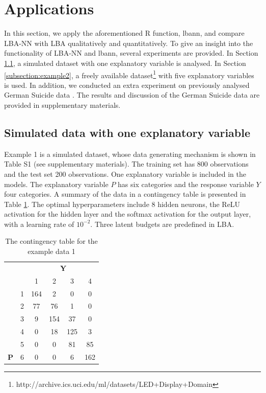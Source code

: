 \documentclass[]{interact}
\theoremstyle{plain}%
\theoremstyle{definition}
\theoremstyle{remark}
\begin{document}
\hypertarget{sec:app}{%
\section{Applications}\label{sec:app}}

In this section, we apply the aforementioned R function, \textsf{lbann},
and compare LBA-NN with LBA qualitatively and quantitatively. To give an
insight into the functionality of LBA-NN and \textsf{lbann}, several
experiments are provided. In Section \ref{subsection:example1}, a
simulated dataset with one explanatory variable is analysed. In Section
\ref{subsection:example2}, a freely available
dataset\footnote{\label{footnote:led} http://archive.ics.uci.edu/ml/datasets/LED+Display+Domain}
with five explanatory variables is used. In addition, we conducted an
extra experiment on previously analysed German Suicide data
\citep{Heijden1992}. The results and discussion of the German Suicide
data are provided in supplementary materials.

\hypertarget{subsection:example1}{%
\subsection{Simulated data with one explanatory
variable}\label{subsection:example1}}

Example 1 is a simulated dataset, whose data generating mechanism is
shown in Table S1 (see supplementary materials). The training set has
800 observations and the test set 200 observations. One explanatory
variable is included in the models. The explanatory variable \(P\) has
six categories and the response variable \(Y\) four categories. A
summary of the data in a contingency table is presented in Table
\ref{tab:tabex1}. The optimal hyperparameters include 8 hidden neurons,
the ReLU activation for the hidden layer and the softmax activation for
the output layer, with a learning rate of \(10^{-2}\). Three latent
budgets are predefined in LBA.

\begin{table}[H]

\caption{\label{tab:tabex1}The contingency table for the example data 1}
\centering
\begin{tabular}[t]{>{}cccccc}
\toprule
\multicolumn{1}{c}{\textbf{ }} & \multicolumn{1}{c}{\textbf{ }} & \multicolumn{4}{c}{\textbf{Y}} \\
\cmidrule(l{3pt}r{3pt}){3-6}
 &  & 1 & 2 & 3 & 4\\
\midrule
 & 1 & 164 & 2 & 0 & 0\\

 & 2 & 77 & 76 & 1 & 0\\

 & 3 & 9 & 154 & 37 & 0\\

 & 4 & 0 & 18 & 125 & 3\\

 & 5 & 0 & 0 & 81 & 85\\

\multirow{-6}{*}{\centering\arraybackslash \textbf{P}} & 6 & 0 & 0 & 6 & 162\\
\bottomrule
\end{tabular}
\end{table}
\end{document}
